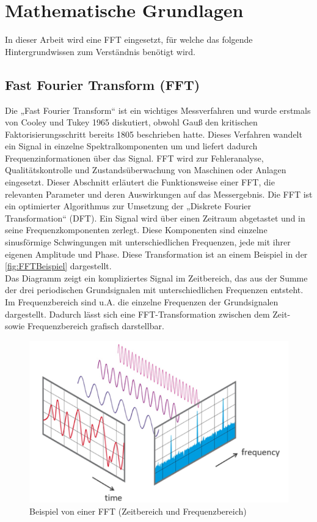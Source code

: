 \section{Mathematische Grundlagen}

In dieser Arbeit wird eine FFT eingesetzt, für welche das folgende Hintergrundwissen zum Verständnis benötigt wird.
\subsection{Fast Fourier Transform (FFT)} \label{abs:FFT}

Die „Fast Fourier Transform“ ist ein wichtiges Messverfahren und wurde erstmals von Cooley und Tukey 1965 diskutiert, obwohl Gauß den kritischen Faktorisierungsschritt bereits 1805 beschrieben hatte. Dieses Verfahren wandelt ein Signal in einzelne Spektralkomponenten um und liefert dadurch Frequenzinformationen über das Signal. FFT wird zur Fehleranalyse, Qualitätskontrolle und Zustandsüberwachung von Maschinen oder Anlagen eingesetzt. Dieser Abschnitt erläutert die Funktionsweise einer FFT, die relevanten Parameter und deren Auswirkungen auf das Messergebnis.
Die FFT ist ein optimierter Algorithmus zur Umsetzung der „Diskrete Fourier Transformation“ (DFT). Ein Signal wird über einen Zeitraum abgetastet und in seine Frequenzkomponenten zerlegt. Diese Komponenten sind einzelne sinusförmige Schwingungen mit unterschiedlichen Frequenzen, jede mit ihrer eigenen Amplitude und Phase. Diese Transformation ist an einem Beispiel in der \autoref{fig:FFTBeispiel} dargestellt.\\
Das Diagramm zeigt ein kompliziertes Signal im Zeitbereich, das aus der Summe der drei periodischen Grundsignalen mit unterschiedlichen Frequenzen entsteht. Im Frequenzbereich sind u.A. die einzelne Frequenzen der Grundsignalen dargestellt. Dadurch lässt sich eine FFT-Transformation zwischen dem Zeit- sowie Frequenzbereich grafisch darstellbar.

\begin{figure}
	\centering
	\includegraphics[width=0.5\linewidth]{Bilder/FFTBeispiel.png}
	\caption{Beispiel von einer FFT (Zeitbereich und Frequenzbereich)\citep{NTIAudioFFT}}
	\label{fig:FFTBeispiel}
\end{figure}

